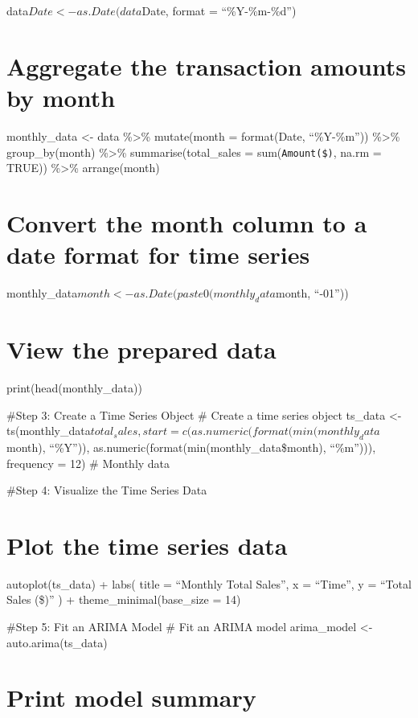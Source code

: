 \documentclass[
]{article}
\begin{document}
data\(Date <- as.Date(data\)Date, format = ``\%Y-\%m-\%d'')

\section{Aggregate the transaction amounts by
month}\label{aggregate-the-transaction-amounts-by-month}

monthly\_data \textless- data \%\textgreater\% mutate(month =
format(Date, ``\%Y-\%m'')) \%\textgreater\% group\_by(month)
\%\textgreater\% summarise(total\_sales = sum(\texttt{Amount(\$)}, na.rm
= TRUE)) \%\textgreater\% arrange(month)

\section{Convert the month column to a date format for time
series}\label{convert-the-month-column-to-a-date-format-for-time-series}

monthly\_data\(month <- as.Date(paste0(monthly_data\)month, ``-01''))

\section{View the prepared data}\label{view-the-prepared-data}

print(head(monthly\_data))

\#Step 3: Create a Time Series Object \# Create a time series object
ts\_data \textless-
ts(monthly\_data\(total_sales, start = c(as.numeric(format(min(monthly_data\)month),
``\%Y'')), as.numeric(format(min(monthly\_data\$month), ``\%m''))),
frequency = 12) \# Monthly data

\#Step 4: Visualize the Time Series Data

\section{Plot the time series data}\label{plot-the-time-series-data}

autoplot(ts\_data) + labs( title = ``Monthly Total Sales'', x =
``Time'', y = ``Total Sales (\$)'' ) + theme\_minimal(base\_size = 14)

\#Step 5: Fit an ARIMA Model \# Fit an ARIMA model arima\_model
\textless- auto.arima(ts\_data)

\section{Print model summary}\label{print-model-summary}
\end{document}
